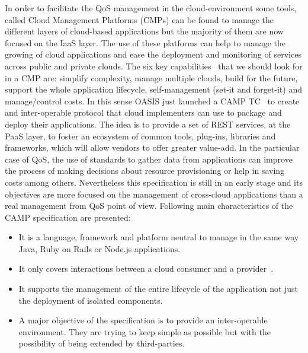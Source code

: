 In order to facilitate the QoS management in the cloud-environment some tools, called Cloud Management Platforms (CMPs) can be found 
to manage the different layers of cloud-based applications but the majority of them are now focused on the IaaS layer. 
The use of these platforms can help to manage the growing of cloud applications and ease the deployment and monitoring of services across 
public and private clouds. The six key capabilities~\cite{Kephart2012} that we should look for in a CMP are: simplify complexity, 
manage multiple clouds, build for the future, support the whole application lifecycle, self-management (set-it and forget-it) and manage/control costs. 
In this sense OASIS just launched a CAMP TC~\cite{OASISCamp} to create and inter-operable protocol that cloud 
implementers can use to package and deploy their applications. The idea is to provide a set of REST services, at the PaaS layer, to foster an ecosystem of 
common tools, plug-ins, libraries and frameworks, which will allow vendors to offer greater value-add. In the particular case of QoS, the use of standards to gather data 
from applications can improve the process of making decisions about resource provisioning or help in saving costs among others. Nevertheless 
this specification is still in an early stage and its objectives are more focused on the management of cross-cloud applications than a 
real management from QoS point of view. Following main characteristics of the CAMP specification are presented:
\begin{itemize}
 \item It is a language, framework and platform neutral to manage in the same way Java, Ruby on Rails or Node.js applications.
 \item It only covers interactions between a cloud consumer and a provider~\cite{mell2011nist}.
 \item It supports the management of the entire lifecycle of the application not just the deployment of isolated components.
 \item A major objective of the specification is to provide an inter-operable environment. They are trying to keep simple as 
 possible but with the possibility of being extended by third-parties.
\end{itemize}

